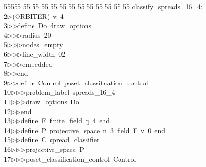 %
%
\begin{tabbing}
55555 \= 55 \= 55 \= 55 \= 55 \= 55 \= 55 \= 55 \= 55 \= 55 \= 55 \= 55 \= 55 \= \>classify\_spreads\_16\_4:\\[0pt]
2\>$\triangleright$\>(ORBITER)\ v\ 4\ \\[0pt]
3\>$\triangleright$\>$\triangleright$\>define\ Do\ draw\_options\ \\[0pt]
4\>$\triangleright$\>$\triangleright$\>$\triangleright$\>radius\ 20\ \\[0pt]
5\>$\triangleright$\>$\triangleright$\>$\triangleright$\>nodes\_empty\ \\[0pt]
6\>$\triangleright$\>$\triangleright$\>$\triangleright$\>line\_width\ 02\ \\[0pt]
7\>$\triangleright$\>$\triangleright$\>$\triangleright$\>embedded\ \\[0pt]
8\>$\triangleright$\>$\triangleright$\>end\ \\[0pt]
9\>$\triangleright$\>$\triangleright$\>define\ Control\ poset\_classification\_control\ \\[0pt]
10\>$\triangleright$\>$\triangleright$\>$\triangleright$\>problem\_label\ spreads\_16\_4\ \\[0pt]
11\>$\triangleright$\>$\triangleright$\>$\triangleright$\>draw\_options\ Do\ \\[0pt]
12\>$\triangleright$\>$\triangleright$\>end\ \\[0pt]
13\>$\triangleright$\>$\triangleright$\>define\ F\ finite\_field\ q\ 4\ end\ \\[0pt]
14\>$\triangleright$\>$\triangleright$\>define\ P\ projective\_space\ n\ 3\ field\ F\ v\ 0\ end\ \\[0pt]
15\>$\triangleright$\>$\triangleright$\>define\ C\ spread\_classifier\ \\[0pt]
16\>$\triangleright$\>$\triangleright$\>$\triangleright$\>projective\_space\ P\ \\[0pt]
17\>$\triangleright$\>$\triangleright$\>$\triangleright$\>poset\_classification\_control\ Control\ \\[0pt]

\end{tabbing}
